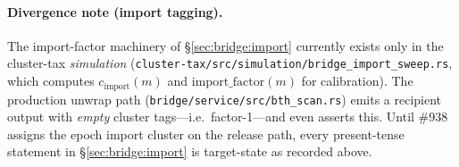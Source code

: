 \paragraph{Divergence note (import tagging).} The import-factor machinery of
\S\ref{sec:bridge:import} currently exists only in the cluster-tax
\emph{simulation} (\texttt{cluster-tax/src/simulation/bridge\_import\_sweep.rs},
which computes $c_{\mathrm{import}}(m)$ and $\mathrm{import\_factor}(m)$ for
calibration). The production unwrap path
(\texttt{bridge/service/src/bth\_scan.rs}) emits a recipient output with
\emph{empty} cluster tags---i.e.\ factor-1---and even asserts this. Until
\#938 assigns the epoch import cluster on the release path, every present-tense
statement in \S\ref{sec:bridge:import} is target-state as recorded above.
